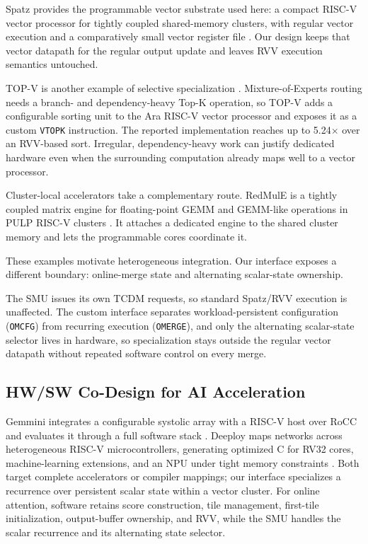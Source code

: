 \documentclass[journal]{IEEEtran}
\begin{document}
Spatz provides the programmable vector substrate used here: a compact RISC-V
vector processor for tightly coupled shared-memory clusters, with regular
vector execution and a comparatively small vector register file
\cite{Spatz2025}. Our design keeps that vector datapath for the regular output
update and leaves RVV execution semantics untouched.

TOP-V is another example of selective specialization \cite{chen2026topv}.
Mixture-of-Experts routing needs a branch- and dependency-heavy Top-K
operation, so TOP-V adds a configurable sorting unit to the Ara RISC-V vector
processor and exposes it as a custom \texttt{VTOPK} instruction. The reported
implementation reaches up to 5.24$\times$ over an RVV-based sort. Irregular,
dependency-heavy work can justify dedicated hardware even when the surrounding
computation already maps well to a vector processor.

Cluster-local accelerators take a complementary route. RedMulE is a tightly
coupled matrix engine for floating-point GEMM and GEMM-like operations in PULP
RISC-V clusters \cite{tortorella2023redmule}. It attaches a dedicated engine to
the shared cluster memory and lets the programmable cores coordinate it.

These examples motivate heterogeneous integration. Our interface exposes a
different boundary: online-merge state and alternating scalar-state ownership.

The SMU issues its own TCDM requests, so standard Spatz/RVV execution is
unaffected. The custom interface separates workload-persistent configuration
(\texttt{OMCFG}) from recurring execution (\texttt{OMERGE}), and only the
alternating scalar-state selector lives in hardware, so specialization stays
outside the regular vector datapath without repeated software control on every
merge.

\subsection{HW/SW Co-Design for AI Acceleration}

Gemmini integrates a configurable systolic array with a RISC-V host over RoCC
and evaluates it through a full software stack \cite{genc2021gemmini}. Deeploy
maps networks across heterogeneous RISC-V microcontrollers, generating
optimized C for RV32 cores, machine-learning extensions, and an NPU under tight
memory constraints \cite{scherer2024deeploy}. Both target complete accelerators
or compiler mappings; our interface specializes a recurrence over persistent
scalar state within a vector cluster. For online attention, software retains
score construction, tile management, first-tile initialization, output-buffer
ownership, and RVV, while the SMU handles the scalar recurrence and its
alternating state selector.
\end{document}
